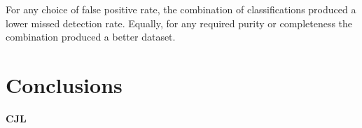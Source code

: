\documentclass[a4paper,fleqn,usenatbib]{mnras}
\begin{document}
For any choice of false positive rate, the combination of classifications produced a lower missed detection rate. Equally, for any required purity or completeness the combination produced a better dataset. 

\section{Conclusions}

\textbf{CJL}

 

\end{document}
